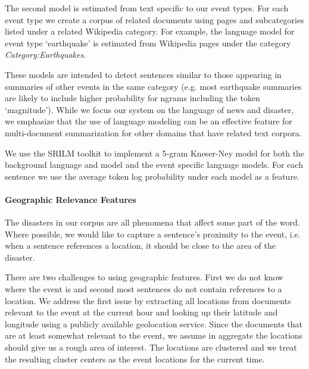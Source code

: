 The second model is estimated from text specific to our event types.  
For each event type we create a corpus of related documents using pages
and subcategories listed under a related Wikipedia category.
For example, the language model for event type `earthquake' is estimated 
from Wikipedia pages under the category \emph{Category:Earthquakes}.  



These models are intended to detect sentences similar to those appearing in 
summaries of other events in the same category 
(e.g. most earthquake summaries are likely to include higher probability for 
ngrams including the token `magnitude'). While we focus our system on the 
language of news and disaster, we emphasize that the use of language modeling 
can be an effective feature for multi-document summarization for other 
domains that have related text corpora.




We use the SRILM toolkit to implement a 5-gram Kneser-Ney model for both
the background language and model and the event specific language models.
For each sentence we use the average token log probability under each model
as a feature.




\paragraph{Geographic Relevance Features}
The disasters in our corpus are all phenomena that
affect some part of the word. 
Where possible, we would like to capture a sentence's proximity to the event,
i.e. when a sentence references a location, it should be close to the 
area of the disaster. 

There are two challenges to using geographic features. First we do not 
know where the event is and second most sentences do not contain references
to a location.
We address the first issue by extracting all locations from 
documents relevant to the event at the
current hour and looking up their latitude and 
longitude using a publicly available geolocation service. 
Since the documents that are at least somewhat relevant to the event,
we assume in aggregate the locations should give us a rough area of interest.
The locations are clustered %
and we treat the resulting cluster centers
as the event locations for the current time.


